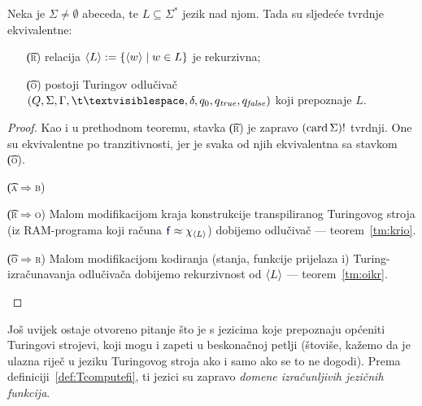 \begin{teorem}
Neka je $\Sigma\not=\emptyset$ abeceda, te $L\subseteq\Sigma^*$ jezik nad njom. Tada su sljedeće tvrdnje ekvivalentne:
\begin{itemize}
    \item[\t{(\textsc r)}] relacija $\langle L\rangle:=\{\langle w\rangle\mid w\in L\}$ je rekurzivna;
    \item[\t{(\textsc o)}] postoji Turingov odlučivač $(Q,\Sigma,\Gamma,\bl,\delta,q_0,q_\mathit{true},q_\mathit{false})$ koji prepoznaje $L$.
\end{itemize}
\end{teorem}
\begin{proof}
Kao i u prethodnom teoremu, stavka \t{(\textsc r)} je zapravo $(\operatorname{card}\Sigma)!$ tvrdnji. One su ekvivalentne po tranzitivnosti, jer je svaka od njih ekvivalentna sa stavkom \t{(\textsc o)}.
\begin{labeling}{\t{(\textsc a$\Rightarrow$\textsc b)}}
\item[\t{(\textsc r$\Rightarrow$\textsc o)}] Malom modifikacijom kraja konstrukcije transpiliranog Turingovog stro\-ja (iz RAM-programa koji računa $\f f\approx\chi_{\kr L}$) dobijemo odlučivač --- teorem~\ref{tm:krio}.
\item[\t{(\textsc o$\Rightarrow$\textsc r)}] Malom modifikacijom kodiranja (stanja, funkcije prijelaza i) Turing-iz\-ra\-ču\-na\-va\-nja odlučivača dobijemo rekurzivnost od $\langle L\rangle$ --- teorem~\ref{tm:oikr}.\qedhere
\end{labeling}
\end{proof}

Još uvijek ostaje otvoreno pitanje što je s jezicima koje prepoznaju općeniti Turingovi strojevi, koji mogu i zapeti u beskonačnoj petlji (štoviše, kažemo da je ulazna riječ u jeziku Turingovog stroja ako i samo ako se to ne dogodi). Prema definiciji~\ref{def:Tcomputefi}, ti jezici su zapravo \emph{domene izračunljivih jezičnih funkcija}.

